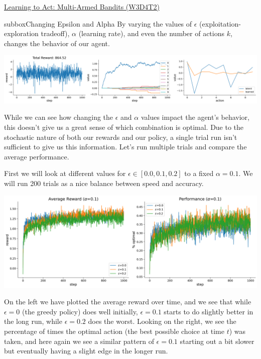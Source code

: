 \begin{textbox}{\href{https://compneuro.neuromatch.io/tutorials/W3D4_ReinforcementLearning/student/W3D4_Tutorial2.html}{Learning to Act: Multi-Armed Bandits (W3D4T2)} }

\begin{subbox}{subbox}{Changing Epsilon and Alpha}
\scriptsize
By varying the values of $\epsilon$ (exploitation-exploration tradeoff), $\alpha$ (learning rate), and even the number of actions $k$, changes the behavior of our agent.


\begin{center}
    
\includegraphics[scale=0.13]{Figures/RL/RL_Figure11.png}
\end{center}

While we can see how changing the $\epsilon$ and $\alpha$ values impact the agent's behavior, this doesn't give us a great sense of which combination is optimal. Due to the stochastic nature of both our rewards and our policy, a single trial run isn't sufficient to give us this information. Let's run multiple trials and compare the average performance.

First we will look at different values for $\epsilon \in [0.0, 0.1, 0.2]$ to a fixed $\alpha=0.1$. We will run 200 trials as a nice balance between speed and accuracy.

\begin{center}
    
\includegraphics[scale=0.15]{Figures/RL/RL_Figure12.png}
\end{center}
On the left we have plotted the average reward over time, and we see that while $\epsilon=0$ (the greedy policy) does well initially, $\epsilon=0.1$ starts to do slightly better in the long run, while $\epsilon=0.2$ does the worst. Looking on the right, we see the percentage of times the optimal action (the best possible choice at time $t$) was taken, and here again we see a similar pattern of $\epsilon=0.1$ starting out a bit slower but eventually having a slight edge in the longer run.


\end{subbox}
\end{textbox}
